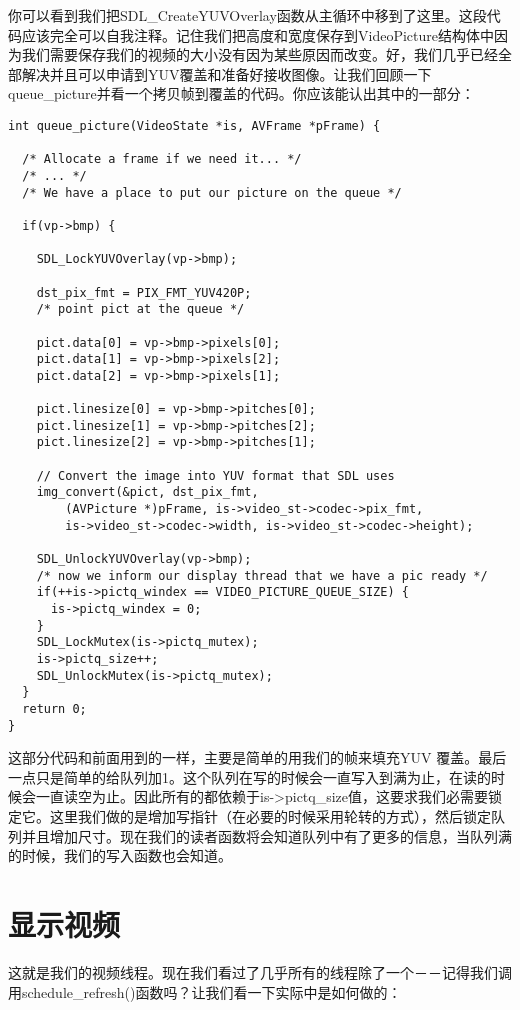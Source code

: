 你可以看到我们把SDL_CreateYUVOverlay函数从主循环中移到了这里。这段代码应该完全可以自我注释。记住我们把高度和宽度保存到VideoPicture结构体中因为我们需要保存我们的视频的大小没有因为某些原因而改变。好，我们几乎已经全部解决并且可以申请到YUV覆盖和准备好接收图像。让我们回顾一下queue_picture并看一个拷贝帧到覆盖的代码。你应该能认出其中的一部分：
\begin{lstlisting}
int queue_picture(VideoState *is, AVFrame *pFrame) {

  /* Allocate a frame if we need it... */
  /* ... */
  /* We have a place to put our picture on the queue */

  if(vp->bmp) {

    SDL_LockYUVOverlay(vp->bmp);

    dst_pix_fmt = PIX_FMT_YUV420P;
    /* point pict at the queue */

    pict.data[0] = vp->bmp->pixels[0];
    pict.data[1] = vp->bmp->pixels[2];
    pict.data[2] = vp->bmp->pixels[1];

    pict.linesize[0] = vp->bmp->pitches[0];
    pict.linesize[1] = vp->bmp->pitches[2];
    pict.linesize[2] = vp->bmp->pitches[1];

    // Convert the image into YUV format that SDL uses
    img_convert(&pict, dst_pix_fmt,
        (AVPicture *)pFrame, is->video_st->codec->pix_fmt,
        is->video_st->codec->width, is->video_st->codec->height);

    SDL_UnlockYUVOverlay(vp->bmp);
    /* now we inform our display thread that we have a pic ready */
    if(++is->pictq_windex == VIDEO_PICTURE_QUEUE_SIZE) {
      is->pictq_windex = 0;
    }
    SDL_LockMutex(is->pictq_mutex);
    is->pictq_size++;
    SDL_UnlockMutex(is->pictq_mutex);
  }
  return 0;
}
\end{lstlisting}


这部分代码和前面用到的一样，主要是简单的用我们的帧来填充YUV 覆盖。最后一点只是简单的给队列加1。这个队列在写的时候会一直写入到满为止，在读的时候会一直读空为止。因此所有的都依赖于is->pictq_size值，这要求我们必需要锁定它。这里我们做的是增加写指针（在必要的时候采用轮转的方式），然后锁定队列并且增加尺寸。现在我们的读者函数将会知道队列中有了更多的信息，当队列满的时候，我们的写入函数也会知道。

\section{显示视频}
这就是我们的视频线程。现在我们看过了几乎所有的线程除了一个－－记得我们调用schedule_refresh()函数吗？让我们看一下实际中是如何做的：

